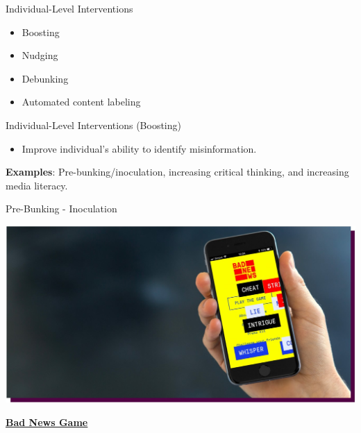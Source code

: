 \documentclass[nobackground,dvipsnames,table]{beamer}
\begin{document}
\begin{frame}{Individual-Level Interventions}

\begin{itemize}
    \item Boosting
    \item Nudging
    \item Debunking
    \item Automated content labeling
\end{itemize}
    
\end{frame}


\begin{frame}{Individual-Level Interventions
(Boosting)}

\begin{itemize}
    \item Improve individual's ability to identify misinformation. \newline 
\end{itemize}

\textbf{Examples}: Pre-bunking/inoculation, increasing critical thinking, and increasing media literacy.
    
\end{frame}



\begin{frame}{Pre-Bunking - Inoculation}

\includegraphics[width=\textwidth]{img/fig7.jpg}

\begin{center}
\underline{\textbf{\href{https://www.getbadnews.com/books/english/}{Bad News Game}}}
\end{center}

\end{frame}
\end{document}
